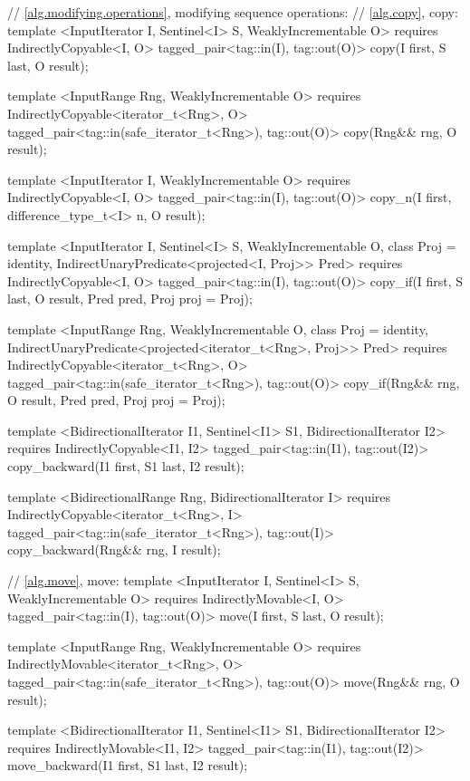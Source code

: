 \begin{codeblock}
{{{{  // \ref{alg.modifying.operations}, modifying sequence operations:
  // \ref{alg.copy}, copy:
  template <InputIterator I, Sentinel<I> S, WeaklyIncrementable O>
    requires IndirectlyCopyable<I, O>
    tagged_pair<tag::in(I), tag::out(O)>
      copy(I first, S last, O result);

  template <InputRange Rng, WeaklyIncrementable O>
    requires IndirectlyCopyable<iterator_t<Rng>, O>
    tagged_pair<tag::in(safe_iterator_t<Rng>), tag::out(O)>
      copy(Rng&& rng, O result);

  template <InputIterator I, WeaklyIncrementable O>
    requires IndirectlyCopyable<I, O>
    tagged_pair<tag::in(I), tag::out(O)>
      copy_n(I first, difference_type_t<I> n, O result);

  template <InputIterator I, Sentinel<I> S, WeaklyIncrementable O, class Proj = identity,
      IndirectUnaryPredicate<projected<I, Proj>> Pred>
    requires IndirectlyCopyable<I, O>
    tagged_pair<tag::in(I), tag::out(O)>
      copy_if(I first, S last, O result, Pred pred, Proj proj = Proj{});

  template <InputRange Rng, WeaklyIncrementable O, class Proj = identity,
      IndirectUnaryPredicate<projected<iterator_t<Rng>, Proj>> Pred>
    requires IndirectlyCopyable<iterator_t<Rng>, O>
    tagged_pair<tag::in(safe_iterator_t<Rng>), tag::out(O)>
      copy_if(Rng&& rng, O result, Pred pred, Proj proj = Proj{});

  template <BidirectionalIterator I1, Sentinel<I1> S1, BidirectionalIterator I2>
    requires IndirectlyCopyable<I1, I2>
    tagged_pair<tag::in(I1), tag::out(I2)>
      copy_backward(I1 first, S1 last, I2 result);

  template <BidirectionalRange Rng, BidirectionalIterator I>
    requires IndirectlyCopyable<iterator_t<Rng>, I>
    tagged_pair<tag::in(safe_iterator_t<Rng>), tag::out(I)>
      copy_backward(Rng&& rng, I result);

  // \ref{alg.move}, move:
  template <InputIterator I, Sentinel<I> S, WeaklyIncrementable O>
    requires IndirectlyMovable<I, O>
    tagged_pair<tag::in(I), tag::out(O)>
      move(I first, S last, O result);

  template <InputRange Rng, WeaklyIncrementable O>
    requires IndirectlyMovable<iterator_t<Rng>, O>
    tagged_pair<tag::in(safe_iterator_t<Rng>), tag::out(O)>
      move(Rng&& rng, O result);

  template <BidirectionalIterator I1, Sentinel<I1> S1, BidirectionalIterator I2>
    requires IndirectlyMovable<I1, I2>
    tagged_pair<tag::in(I1), tag::out(I2)>
      move_backward(I1 first, S1 last, I2 result);

}}}}
\end{codeblock}
